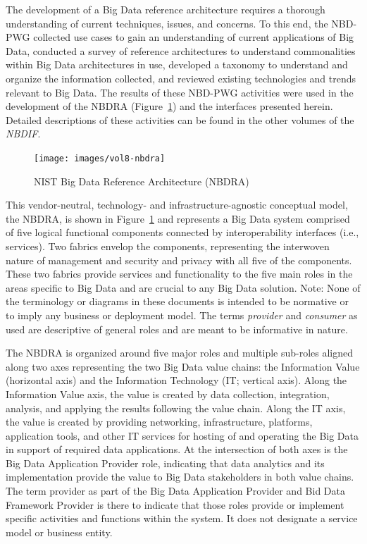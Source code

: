 \documentclass[10pt]{article}
\begin{document}
The development of a Big Data reference architecture requires a thorough understanding of current
techniques, issues, and concerns. To this end, the NBD-PWG collected use cases to gain an 
understanding of current applications of Big Data, conducted a survey of reference architectures 
to understand commonalities within Big Data architectures in use, developed a taxonomy to understand
and organize the information collected, and reviewed existing technologies and trends relevant 
to Big Data. The results of these NBD-PWG activities were used in the development of the NBDRA 
(Figure~\ref{F:architecture}) and the interfaces presented herein. Detailed descriptions of these activities can 
be found in the other volumes of the {\it NBDIF}. 

\begin{figure}[h]\centering
\texttt{[image: images/vol8-nbdra]}
\caption{NIST Big Data Reference Architecture (NBDRA)}
\label{F:architecture}
\end{figure}


This vendor-neutral, technology- and infrastructure-agnostic conceptual model, the NBDRA, is shown 
in Figure~\ref{F:architecture} and represents a Big Data system comprised of five logical functional components 
connected by interoperability interfaces (i.e., services). Two fabrics envelop the components, 
representing the interwoven nature of management and security and privacy with all five of the 
components. These two fabrics provide services and functionality to the five main roles in the areas
specific to Big Data and are crucial to any Big Data solution.
Note: None of the terminology or diagrams in these documents is intended to be normative or to imply
any business or deployment model. The terms {\it provider} and {\it consumer} as used are descriptive 
of general roles and are meant to be informative in nature.

The NBDRA is organized around five major roles and multiple sub-roles aligned along two axes 
representing the two Big Data value chains: the Information Value (horizontal axis) and the Information
Technology (IT; vertical axis). Along the Information Value axis, the value is created by data collection,
integration, analysis, and applying the results following the value chain. Along the IT axis, the value
is created by providing networking, infrastructure, platforms, application tools, and other IT services
for hosting of and operating the Big Data in support of required data applications. At the intersection
of both axes is the Big Data Application Provider role, indicating that data analytics and its 
implementation provide the value to Big Data stakeholders in both value chains. The term provider 
as part of the Big Data Application Provider and Bid Data Framework Provider is there to indicate 
that those roles provide or implement specific activities and functions within the system. It does 
not designate a service model or business entity.
\end{document}
